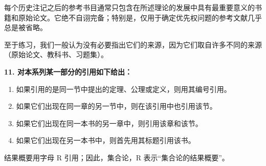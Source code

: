 每个历史注记之后的参考书目通常只包含在所述理论的发展中具有最重要意义的书籍和原始论文。它绝不自诩完备；特别是，仅用于确定优先权问题的参考文献几乎总是被省略。

至于练习，我们一般认为没有必要指出它们的来源，因为它们取自许多不同的来源（原始论文、教科书、习题集）。

\par\noindent\textbf{11. 对本系列某一部分的引用如下给出：}\par

\begin{enumerate}
\def\labelenumi{\alph{enumi})}
\item
  如果引用的是同一节中提出的定理、公理或定义，则用其编号引用。
\item
  如果它们出现在同一章的另一节中，则在该引用中也引用该节。
\item
  如果它们出现在同一本书的另一章中，则引用该章和该节。
\item
  如果它们出现在另一本书中，则首先用其标题引用该书。
\end{enumerate}

结果概要用字母 R 引用；因此，集合论，R 表示“集合论的结果概要”。

